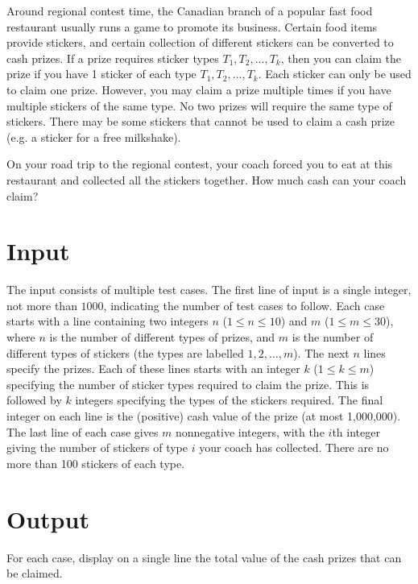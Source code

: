 
%
Around regional contest time, the Canadian branch of a popular fast
food restaurant usually runs a game to promote its business.  Certain
food items provide stickers, and certain collection of different
stickers can be converted to cash prizes.  If a prize requires sticker
types $T_1, T_2, \ldots, T_k$, then you can claim the prize if you
have 1 sticker of each type $T_1, T_2, \ldots, T_k$.  Each sticker
can only be used to claim one prize.  However, you may claim a prize
multiple times if you have multiple stickers of the same type.  No two
prizes will require the same type of stickers.  There may be some
stickers that cannot be used to claim a cash prize (e.g. a sticker
for a free milkshake).

On your road trip to the regional contest, your coach forced you to
eat at this restaurant and collected all the stickers together.  How
much cash can your coach claim?

\section*{Input}
The input consists of multiple test cases. The first line of input
is a single integer, not more than $1000$, indicating the number 
of test cases to follow.  
Each case starts with a line containing two integers $n$ ($1
\leq n \leq 10$) and $m$ ($1 \leq m \leq 30$), where $n$ is the number of different
types of prizes, and $m$ is the number of different types of stickers
(the types are labelled $1, 2, \ldots, m$).  The next $n$ lines
specify the prizes.  Each of these lines starts with an integer $k$ ($1
\leq k \leq m$) specifying the number of sticker types required to
claim the prize.  This is followed by $k$ integers specifying the
types of the stickers required.  The final integer on each line is the
(positive) cash value of the prize (at most 1,000,000).  The last line of each
case gives $m$ nonnegative integers, with the $i$th integer giving
the number of stickers of type $i$ your coach has collected. There are no
more than 100 stickers of each type.

\section*{Output}
For each case, display on a single line the total value of
the cash prizes that can be claimed.

